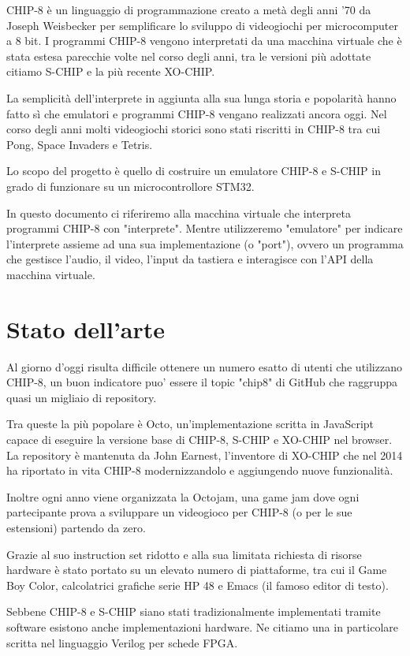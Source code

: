 \documentclass[a4paper]{article}
\begin{document}
CHIP-8 è un linguaggio di programmazione creato a metà degli anni '70
da Joseph Weisbecker per semplificare lo sviluppo di videogiochi per
microcomputer a 8 bit. I programmi CHIP-8 vengono interpretati da una
macchina virtuale che è stata estesa parecchie volte nel corso degli
anni, tra le versioni più adottate citiamo S-CHIP e la più recente
XO-CHIP.

La semplicità dell'interprete in aggiunta alla sua lunga storia e
popolarità hanno fatto sì che emulatori e programmi CHIP-8 vengano
realizzati ancora oggi.
Nel corso degli anni molti videogiochi storici sono stati riscritti
in CHIP-8 tra cui Pong, Space Invaders e Tetris.

Lo scopo del progetto è quello di costruire un emulatore CHIP-8 e
S-CHIP in grado di funzionare su un microcontrollore STM32.

In questo documento ci riferiremo alla macchina virtuale che
interpreta programmi CHIP-8 con "interprete". Mentre utilizzeremo
"emulatore" per indicare l'interprete assieme ad una sua
implementazione (o "port"), ovvero un programma che gestisce
l'audio, il video, l'input da tastiera e interagisce con l'API della
macchina virtuale.

\section{Stato dell'arte}

Al giorno d'oggi risulta difficile ottenere un numero esatto di utenti che utilizzano CHIP-8, un buon indicatore puo' essere il topic "chip8" di GitHub che raggruppa quasi un migliaio di repository.

Tra queste la più popolare è Octo, un'implementazione scritta in JavaScript capace di eseguire la versione base di CHIP-8, S-CHIP e XO-CHIP nel browser. La repository è mantenuta da John Earnest, l'inventore di XO-CHIP che nel 2014 ha riportato in vita CHIP-8 modernizzandolo e aggiungendo nuove funzionalità.

Inoltre ogni anno viene organizzata la Octojam, una game jam dove ogni partecipante prova a sviluppare un videogioco per CHIP-8 (o per le sue estensioni) partendo da zero.

Grazie al suo instruction set ridotto e alla sua limitata richiesta di risorse hardware è stato portato su un elevato numero di piattaforme, tra cui il Game Boy Color, calcolatrici grafiche serie HP 48 e Emacs (il famoso editor di testo).

Sebbene CHIP-8 e S-CHIP siano stati tradizionalmente implementati tramite software esistono anche implementazioni hardware. Ne citiamo una in particolare scritta nel linguaggio Verilog per schede FPGA.
\end{document}
